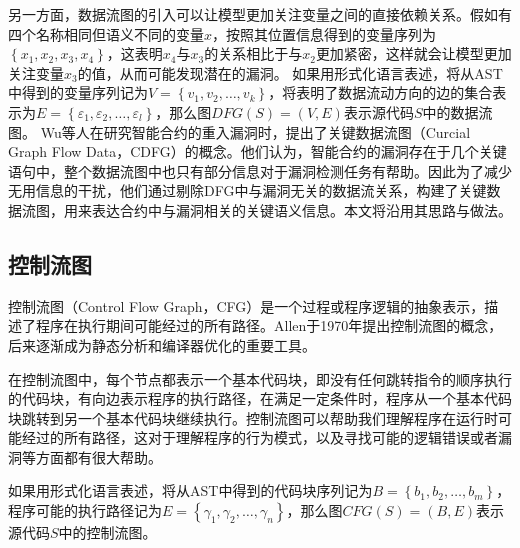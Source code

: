 
另一方面，数据流图的引入可以让模型更加关注变量之间的直接依赖关系。假如有四个名称相同但语义不同的变量$x$，按照其位置信息得到的变量序列为$\left\{x_1, x_2, x_3, x_4\right\}$，这表明$x_4$与$x_3$的关系相比于与$x_2$更加紧密，这样就会让模型更加关注变量$x_3$的值，从而可能发现潜在的漏洞。
如果用形式化语言表述，将从AST中得到的变量序列记为$V=\left\{v_1, v_2, \ldots, v_k\right\}$，将表明了数据流动方向的边的集合表示为$E=\left\{\varepsilon_1, \varepsilon_2, \ldots, \varepsilon_l\right\}$，那么图$DFG(S)=(V, E)$表示源代码$S$中的数据流图。
Wu等人\cite{wu2021peculiar}在研究智能合约的重入漏洞时，提出了关键数据流图（Curcial Graph Flow Data，CDFG）的概念。他们认为，智能合约的漏洞存在于几个关键语句中，整个数据流图中也只有部分信息对于漏洞检测任务有帮助。因此为了减少无用信息的干扰，他们通过剔除DFG中与漏洞无关的数据流关系，构建了关键数据流图，用来表达合约中与漏洞相关的关键语义信息。本文将沿用其思路与做法。
\subsection{控制流图}
\label{sec:控制流图}

控制流图（Control Flow Graph，CFG）是一个过程或程序逻辑的抽象表示，描述了程序在执行期间可能经过的所有路径。Allen于1970年提出控制流图的概念\cite{allencfg}，后来逐渐成为静态分析和编译器优化的重要工具。

在控制流图中，每个节点都表示一个基本代码块，即没有任何跳转指令的顺序执行的代码块，有向边表示程序的执行路径，在满足一定条件时，程序从一个基本代码块跳转到另一个基本代码块继续执行。控制流图可以帮助我们理解程序在运行时可能经过的所有路径，这对于理解程序的行为模式，以及寻找可能的逻辑错误或者漏洞等方面都有很大帮助。

如果用形式化语言表述，将从AST中得到的代码块序列记为$B=\left\{b_1, b_2,\ldots, b_m\right\}$，程序可能的执行路径记为$E=\left\{\gamma_1, \gamma_2, \ldots, \gamma_n\right\}$，那么图$CFG(S)=(B, E)$表示源代码$S$中的控制流图。




